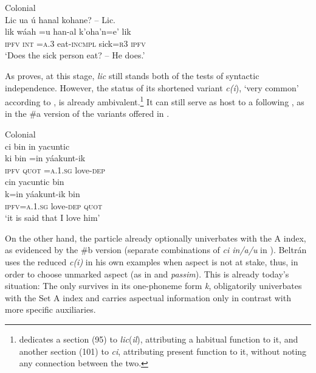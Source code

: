 \documentclass[output=paper]{langsci/langscibook}
\begin{document}
\ea\label{ex:lehmann:30}
Colonial  \\
  Lic    ua    ú      hanal      kohane? –    Lic.\\
\gll   lik    wáah  =u    han-al      k’oha’n=e’    lik\\
\textsc{ipfv    int    =a.3}   eat-\textsc{incmpl}  sick=\textsc{r3}      \textsc{ipfv}\\
\glt ‘Does the sick person eat? – He does.’ \citep[§299, p.140]{Beltrán1746} 
\z



As  proves, at this stage, \textit{lic} still stands both of the tests of syntactic independence. However, the status of its shortened variant \textit{c(i}), ‘very common’ according to \citet[§101]{Beltrán1746}, is already ambivalent.\footnote{\citeauthor{Beltrán1746} dedicates a section (95) to \textit{lic}(\textit{il}), attributing a habitual function to it, and another section (101) to \textit{ci}, attributing present  function to it, without noting any connection between the two.} It can still serve as host to a following , as in the \#a version of the variants offered in .


\ea\label{ex:lehmann:31}
Colonial  \\
\ea 
ci    bin    in        yacuntic\\
\gll   ki    bin    =in      yáakunt-ik\\
\textsc{ipfv}  \textsc{quot}    \textsc{=a.1.sg}    love-\textsc{dep}\\

\ex 
cin          yacuntic    bin\\
\gll   k=in          yáakunt-ik  bin\\
\textsc{ipfv=a.1.sg}    love-\textsc{dep  }    \textsc{quot}\\
\glt ‘it is said that I love him’ \citep[§246]{Beltrán1746} 
\z
\z


On the other hand, the particle already optionally univerbates with the  A index, as evidenced by the \#b version (separate combinations of \textit{ci in/a/u} in \citealt[§131]{Beltrán1746}). Beltrán uses the reduced  \textit{c(i)} in his own examples when aspect is not at stake, thus, in order to choose unmarked aspect (as in  and \textit{passim}). This is already today’s situation: The  only survives in its one-phoneme form \textit{k}, obligatorily univerbates with the Set A index and carries aspectual information only in contrast with more specific auxiliaries.
\end{document}
